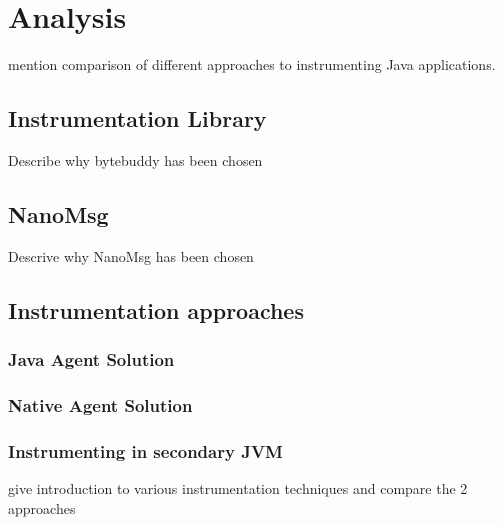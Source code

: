 \chapter{Analysis}
mention comparison of different approaches to instrumenting Java applications.

\section{Instrumentation Library}

Describe why bytebuddy has been chosen

\section{NanoMsg}
 Descrive why NanoMsg has been chosen
\section{Instrumentation approaches}
\subsection{Java Agent Solution}
\subsection{Native Agent Solution}
\subsection{Instrumenting in secondary JVM}

give introduction to various instrumentation techniques and compare the 2 approaches


